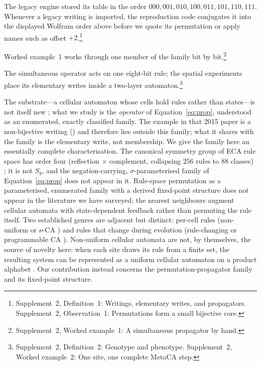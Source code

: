 \documentclass[man,12pt,floatsintext,donotrepeattitle]{apa7}
\newcommand{\sig}{\sigma}
\newcommand{\secref}[1]{\emph{\nameref{#1}}}
\newcommand{\supptheorytext}[2]{Supplement~2, #1: #2.}
\newcommand{\supptheory}[2]{\footnote{\supptheorytext{#1}{#2}}}
\newcommand{\suppnote}[1]{\footnote{#1}}
\begin{document}
The legacy engine stored its table in the order
$000,001,010,100,011,101,110,111$. Whenever a legacy writing is imported, the
reproduction code conjugates it into the displayed Wolfram order above before
we quote its permutation or apply names such as offset $+2$.\suppnote{\supptheorytext{Definition~1}{Writings, elementary writes, and propagators} \supptheorytext{Observation~1}{Permutations form a small bijective core}}

Worked example~1 works through one member of the
family bit by bit.\supptheory{Worked example~1}{A simultaneous propagator by hand}

The simultaneous operator acts on one eight-bit rule; the spatial experiments
place its elementary writes inside a two-layer automaton.\suppnote{\supptheorytext{Definition~2}{Genotype and phenotype} \supptheorytext{Worked example~2}{One site, one complete MetaCA step}}

The substrate---a cellular automaton whose cells hold rules rather than
states---is not itself new \parencite{corneli2015search}; what we study
is the \emph{operator} of Equation~\eqref{eq:prop}, understood as an
enumerated, exactly classified family. The example in that 2015 paper is a
non-bijective writing (\secref{sec:warmup}) and therefore lies outside this
family; what it shares with the family is the elementary write, not membership.
We give the family here an essentially complete characterisation. The canonical symmetry group of ECA
rule space has order four (reflection $\times$ complement, collapsing $256$
rules to $88$ classes) \parencite{svozil2025symmetries}; it is not $S_8$,
and the negation-carrying, $\sig$-parameterised family of
Equation~\eqref{eq:prop} does not appear in it. Rule-space permutation as a
parameterised, enumerated family with a derived fixed-point structure does
not appear in the literature we have surveyed; the nearest neighbours
augment cellular automata with state-dependent feedback
\parencite{pavlic2014selfref} rather than permuting the rule itself. Two
established genres are adjacent but distinct: per-cell rules (non-uniform or
$\nu$-CA \parencite{dennunzio2011nonuniform}) and rules that change during
evolution (rule-changing or programmable CA
\parencite{mori1998rulechanging}). Non-uniform cellular automata are not, by
themselves, the source of novelty here: when each site draws its rule from a
finite set, the resulting system can be represented as a uniform cellular
automaton on a product alphabet \parencite{dennunzio2011nonuniform}. Our
contribution instead concerns the permutation-propagator family and its
fixed-point structure.
\end{document}
